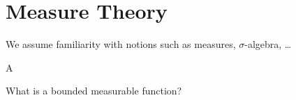 \section{Measure Theory}

We assume familiarity with notions such as measures, $\sigma$-algebra, \dots

\begin{definition}
   A 
\end{definition}

\begin{definition}
   
\end{definition}

What is a bounded measurable function?

\begin{definition}
   
\end{definition}

